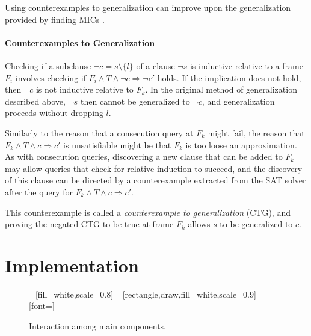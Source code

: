 \documentclass[12pt,a4paper,twoside,openright]{report}
\begin{document}
{{Using counterexamples to generalization can improve upon the
generalization provided by finding MICs \cite{hassan13}.

\subsubsection{Counterexamples to Generalization}

Checking if a subclause $\neg c = s \setminus \{l\}$ of a clause $\neg s$ is inductive
relative to a frame $F_i$ involves checking if
$F_i \wedge T \wedge \neg c \Rightarrow \neg c'$ holds.
If the implication does not hold, then $\neg c$ is not inductive relative to
$F_k$. In the original method of generalization described above,
$\neg s$ then cannot be generalized to $\neg c$, and generalization
proceeds without dropping $l$.

Similarly to the reason that a consecution query at $F_k$ might fail,
the reason that
$F_k \wedge T \wedge c \Rightarrow c'$ is unsatisfiable might be that
$F_k$ is too loose an approximation. As with consecution queries, discovering a
new clause that can be added to $F_k$ may allow queries that
check for relative induction to succeed, and the discovery of this
clause can be directed by a counterexample extracted from the
SAT solver after the query for $F_k \wedge T \wedge c \Rightarrow c'$.

This counterexample is called a \emph{counterexample
to generalization} (CTG), and proving the negated CTG to be true at
frame $F_k$ allows $s$ to be generalized to $c$.


\chapter{Implementation}
\label{impl}

\begin{figure}[t]
=[fill=white,scale=0.8]
=[rectangle,draw,fill=white,scale=0.9]
=[font=\footnotesize]
\caption{Interaction among main components.}
\label{components}
\end{figure}

}}
\end{document}
